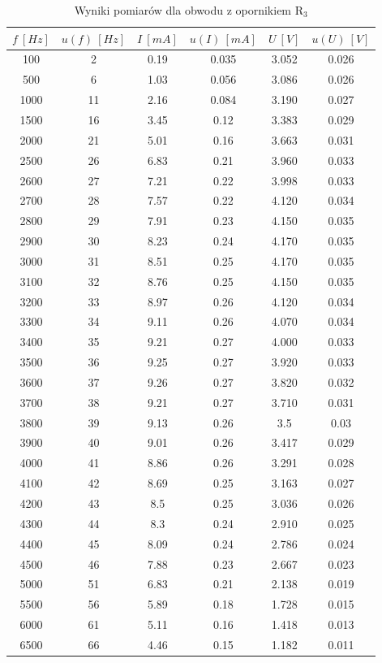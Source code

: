 \documentclass[12pt, a4paper, oneside]{article}
\begin{document}
\clearpage
\begin{table}[h]
  \centering
  \caption{Wyniki pomiarów dla obwodu z opornikiem R$_3$}
    \begin{tabular}{|c|c|c|c|c|c|}\hline
    $f~[Hz]$ & $u(f)~[Hz]$ & $I~[mA]$ & $u(I)~[mA]$ & $U~[V]$ & $u(U)~[V]$ \\\hline
    100 & 2 & 0.19 & 0.035 & 3.052 & 0.026 \\\hline
    500 & 6 & 1.03 & 0.056 & 3.086 & 0.026 \\\hline
    1000 & 11 & 2.16 & 0.084 & 3.190 & 0.027 \\\hline
    1500 & 16 & 3.45 & 0.12 & 3.383 & 0.029 \\\hline
    2000 & 21 & 5.01 & 0.16 & 3.663 & 0.031 \\\hline
    2500 & 26 & 6.83 & 0.21 & 3.960 & 0.033 \\\hline
    2600 & 27 & 7.21 & 0.22 & 3.998 & 0.033 \\\hline
    2700 & 28 & 7.57 & 0.22 & 4.120 & 0.034 \\\hline
    2800 & 29 & 7.91 & 0.23 & 4.150 & 0.035 \\\hline
    2900 & 30 & 8.23 & 0.24 & 4.170 & 0.035 \\\hline
    3000 & 31 & 8.51 & 0.25 & 4.170 & 0.035 \\\hline
    3100 & 32 & 8.76 & 0.25 & 4.150 & 0.035 \\\hline
    3200 & 33 & 8.97 & 0.26 & 4.120 & 0.034 \\\hline
    3300 & 34 & 9.11 & 0.26 & 4.070 & 0.034 \\\hline
    3400 & 35 & 9.21 & 0.27 & 4.000 & 0.033 \\\hline
    3500 & 36 & 9.25 & 0.27 & 3.920 & 0.033 \\\hline
    3600 & 37 & 9.26 & 0.27 & 3.820 & 0.032 \\\hline
    3700 & 38 & 9.21 & 0.27 & 3.710 & 0.031 \\\hline
    3800 & 39 & 9.13 & 0.26 & 3.5 & 0.03 \\\hline
    3900 & 40 & 9.01 & 0.26 & 3.417 & 0.029 \\\hline
    4000 & 41 & 8.86 & 0.26 & 3.291 & 0.028 \\\hline
    4100 & 42 & 8.69 & 0.25 & 3.163 & 0.027 \\\hline
    4200 & 43 & 8.5 & 0.25 & 3.036 & 0.026 \\\hline
    4300 & 44 & 8.3 & 0.24 & 2.910 & 0.025 \\\hline
    4400 & 45 & 8.09 & 0.24 & 2.786 & 0.024 \\\hline
    4500 & 46 & 7.88 & 0.23 & 2.667 & 0.023 \\\hline
    5000 & 51 & 6.83 & 0.21 & 2.138 & 0.019 \\\hline
    5500 & 56 & 5.89 & 0.18 & 1.728 & 0.015 \\\hline
    6000 & 61 & 5.11 & 0.16 & 1.418 & 0.013 \\\hline
    6500 & 66 & 4.46 & 0.15 & 1.182 & 0.011 \\\hline
    \end{tabular}%
  \label{tab:addlabel}%
\end{table}%
\end{document}
